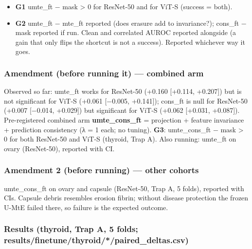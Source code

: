 {\begin{itemize}

\item
  \textbf{G1} umte\_ft − mask \textgreater{} 0 for ResNet-50 and for ViT-S (success = both).
\item
  \textbf{G2} umte\_ft − mte\_ft reported (does erasure add to invariance?); cons\_ft − mask reported if run.
  Clean and correlated AUROC reported alongside (a gain that only flips the shortcut is not a success).
  Reported whichever way it goes.
\end{itemize}

\subsubsection{Amendment (before running it) --- combined arm}\label{amendment-before-running-it--combined-arm}

Observed so far: umte\_ft works for ResNet-50 (+0.160 {[}+0.114, +0.207{]}) but is not significant for ViT-S (+0.061
{[}−0.005, +0.141{]}); cons\_ft is null for ResNet-50 (+0.007 {[}−0.014, +0.029{]}) but significant for ViT-S (+0.062
{[}+0.031, +0.087{]}). Pre-registered combined arm \textbf{umte\_cons\_ft} = projection + feature invariance + prediction
consistency (λ = 1 each; no tuning). \textbf{G3}: umte\_cons\_ft − mask \textgreater{} 0 for both ResNet-50 and ViT-S (thyroid, Trap A).
Also running: umte\_ft on ovary (ResNet-50), reported with CI.

\subsubsection{Amendment 2 (before running) --- other cohorts}\label{amendment-2-before-running--other-cohorts}

umte\_cons\_ft on ovary and capsule (ResNet-50, Trap A, 5 folds), reported with CIs. Capsule debris resembles erosion
fibrin; without disease protection the frozen U-MtE failed there, so failure is the expected outcome.

\subsubsection{Results (thyroid, Trap A, 5 folds; results/finetune/thyroid/*/paired\_deltas.csv)}\label{results-thyroid-trap-a-5-folds-resultsfinetunethyroidpaired_deltascsv}

}
